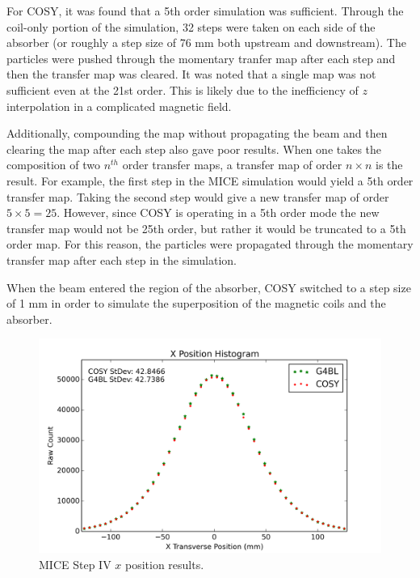 For COSY, it was found that a 5th order simulation was sufficient. Through the coil-only portion of the simulation, 32 steps were taken on each side of the absorber (or roughly a step size of 76 mm both upstream and downstream). The particles were pushed through the momentary tranfer map after each step and then the transfer map was cleared. It was noted that a single map was not sufficient even at the 21st order. This is likely due to the inefficiency of $z$ interpolation in a complicated magnetic field. 

Additionally, compounding the map without propagating the beam and then clearing the map after each step also gave poor results. When one takes the composition of two $n^{th}$ order transfer maps, a transfer map of order $n\times n$ is the result. For example, the first step in the MICE simulation would yield a 5th order transfer map. Taking the second step would give a new transfer map of order $5\times 5 = 25$. However, since COSY is operating in a 5th order mode the new transfer map would not be 25th order, but rather it would be truncated to a 5th order map. For this reason, the particles were propagated through the momentary transfer map after each step in the simulation.

When the beam entered the region of the absorber, COSY switched to a step size of 1 mm in order to simulate the superposition of the magnetic coils and the absorber.

\begin{figure}[h!]
  \centering
    \includegraphics[width=\textwidth]{MICE data/MICE_1M_x} 
  \caption{MICE Step IV $x$ position results.}
  \label{fig:micex}
\end{figure}

